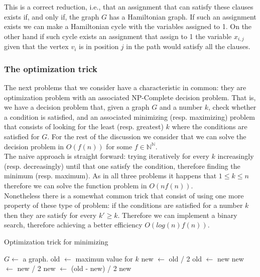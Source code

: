 This is a correct reduction, i.e., that an assignment that can satisfy these clauses exists if, and only if, the graph $G$ has a Hamiltonian graph. If such an assignment exists we can make a Hamiltonian cycle with the variables assigned to 1. On the other hand if such cycle exists an assignment that assign to 1 the variable $x_{i,j}$ given that the vertex $v_i$ is in position $j$ in the path would satisfy all the clauses. 

\subsubsection{The optimization trick}

The next problems that we consider have a characteristic in common: they are optimization problem with an associated NP-Complete decision problem. That is, we have a decision problem that, given a graph $G$ and a number $k$, check whether a condition is satisfied, and an associated minimizing (resp. maximizing) problem that consists of looking for the least (resp. greatest) $k$ where the conditions are satisfied for $G$. For the rest of the discussion we consider that we can solve the decision problem in $O(f(n))$ for some $f\in \mathbb{N}^\mathbb{N}$. \\

The naive approach is straight forward: trying iteratively for every $k$ increasingly (resp. decreasingly) until that one satisfy the condition, therefore finding the minimum (resp. maximum). As in all three problems it happens that $1\le k \le n$ therefore we can solve the function problem in $O(nf(n))$. \\

Nonetheless there is a somewhat common trick that consist of using one more property of these type of problem: if the conditions are satisfied for a number $k$ then they are satisfy for every $k' \ge k$. Therefore we can implement a binary search, therefore achieving a better efficiency $O(log(n)f(n))$.\\


\begin{algorithm}
  \caption{Optimization trick for minimizing}\label{bt}
  \begin{algorithmic}[1]
    \State $G \gets$ a graph.
    \State old $\gets$ maximun value for $k$
    \State new $\gets$ old / 2
         \State   old $\gets$ new
         \State   new $\gets$ new / 2
         \Else
         \State new $\gets$ (old - new) / 2
         \EndIf
    \EndWhile
    \State \Return new
  \end{algorithmic}
\end{algorithm}

